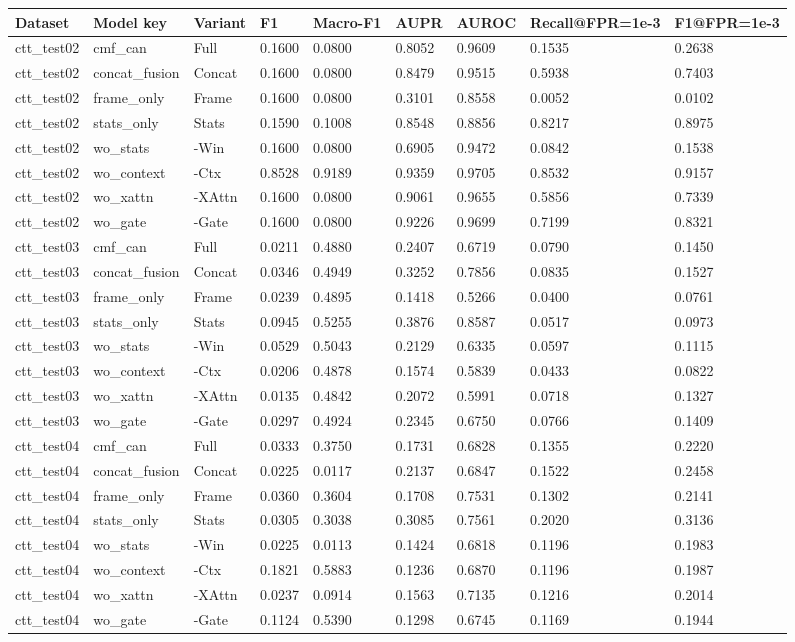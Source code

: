 \begin{tabular}{lllllllll}
\toprule
Dataset & Model key & Variant & F1 & Macro-F1 & AUPR & AUROC & Recall@FPR=1e-3 & F1@FPR=1e-3 \\
\midrule
ctt_test02 & cmf_can & Full & 0.1600 & 0.0800 & 0.8052 & 0.9609 & 0.1535 & 0.2638 \\
ctt_test02 & concat_fusion & Concat & 0.1600 & 0.0800 & 0.8479 & 0.9515 & 0.5938 & 0.7403 \\
ctt_test02 & frame_only & Frame & 0.1600 & 0.0800 & 0.3101 & 0.8558 & 0.0052 & 0.0102 \\
ctt_test02 & stats_only & Stats & 0.1590 & 0.1008 & 0.8548 & 0.8856 & 0.8217 & 0.8975 \\
ctt_test02 & wo_stats & -Win & 0.1600 & 0.0800 & 0.6905 & 0.9472 & 0.0842 & 0.1538 \\
ctt_test02 & wo_context & -Ctx & 0.8528 & 0.9189 & 0.9359 & 0.9705 & 0.8532 & 0.9157 \\
ctt_test02 & wo_xattn & -XAttn & 0.1600 & 0.0800 & 0.9061 & 0.9655 & 0.5856 & 0.7339 \\
ctt_test02 & wo_gate & -Gate & 0.1600 & 0.0800 & 0.9226 & 0.9699 & 0.7199 & 0.8321 \\
ctt_test03 & cmf_can & Full & 0.0211 & 0.4880 & 0.2407 & 0.6719 & 0.0790 & 0.1450 \\
ctt_test03 & concat_fusion & Concat & 0.0346 & 0.4949 & 0.3252 & 0.7856 & 0.0835 & 0.1527 \\
ctt_test03 & frame_only & Frame & 0.0239 & 0.4895 & 0.1418 & 0.5266 & 0.0400 & 0.0761 \\
ctt_test03 & stats_only & Stats & 0.0945 & 0.5255 & 0.3876 & 0.8587 & 0.0517 & 0.0973 \\
ctt_test03 & wo_stats & -Win & 0.0529 & 0.5043 & 0.2129 & 0.6335 & 0.0597 & 0.1115 \\
ctt_test03 & wo_context & -Ctx & 0.0206 & 0.4878 & 0.1574 & 0.5839 & 0.0433 & 0.0822 \\
ctt_test03 & wo_xattn & -XAttn & 0.0135 & 0.4842 & 0.2072 & 0.5991 & 0.0718 & 0.1327 \\
ctt_test03 & wo_gate & -Gate & 0.0297 & 0.4924 & 0.2345 & 0.6750 & 0.0766 & 0.1409 \\
ctt_test04 & cmf_can & Full & 0.0333 & 0.3750 & 0.1731 & 0.6828 & 0.1355 & 0.2220 \\
ctt_test04 & concat_fusion & Concat & 0.0225 & 0.0117 & 0.2137 & 0.6847 & 0.1522 & 0.2458 \\
ctt_test04 & frame_only & Frame & 0.0360 & 0.3604 & 0.1708 & 0.7531 & 0.1302 & 0.2141 \\
ctt_test04 & stats_only & Stats & 0.0305 & 0.3038 & 0.3085 & 0.7561 & 0.2020 & 0.3136 \\
ctt_test04 & wo_stats & -Win & 0.0225 & 0.0113 & 0.1424 & 0.6818 & 0.1196 & 0.1983 \\
ctt_test04 & wo_context & -Ctx & 0.1821 & 0.5883 & 0.1236 & 0.6870 & 0.1196 & 0.1987 \\
ctt_test04 & wo_xattn & -XAttn & 0.0237 & 0.0914 & 0.1563 & 0.7135 & 0.1216 & 0.2014 \\
ctt_test04 & wo_gate & -Gate & 0.1124 & 0.5390 & 0.1298 & 0.6745 & 0.1169 & 0.1944 \\
\bottomrule
\end{tabular}
